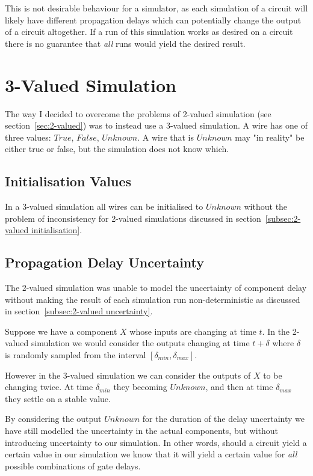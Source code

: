 This is not desirable behaviour for a simulator, as each simulation of a circuit will likely have different propagation delays which can potentially change the output of a circuit altogether. If a run of this simulation works as desired on a circuit there is no guarantee that \textit{all} runs would yield the desired result.

\section{3-Valued Simulation}
\label{sec:3-valued}
The way I decided to overcome the problems of 2-valued simulation (see section~\ref{sec:2-valued}) was to instead use a 3-valued simulation. A wire has one of three values: $True$, $False$, $Unknown$. A wire that is $Unknown$ may "in reality" be either true or false, but the simulation does not know which.

\subsection{Initialisation Values}
In a 3-valued simulation all wires can be initialised to $Unknown$ without the problem of inconsistency for 2-valued simulations discussed in section~\ref{subsec:2-valued initialisation}.

\subsection{Propagation Delay Uncertainty}
\label{subsec:3-valued uncertainty}
The 2-valued simulation was unable to model the uncertainty of component delay without making the result of each simulation run non-deterministic as discussed in section~\ref{subsec:2-valued uncertainty}.

Suppose we have a component $X$ whose inputs are changing at time $t$. In the 2-valued simulation we would consider the outputs changing at time $t + \delta$ where $\delta$ is randomly sampled from the interval $[\delta_{min}, \delta_{max}]$. 

However in the 3-valued simulation we can consider the outputs of $X$ to be changing twice. At time $\delta_{min}$ they becoming $Unknown$, and then at time $\delta_{max}$ they settle on a stable value. 

By considering the output $Unknown$ for the duration of the delay uncertainty we have still modelled the uncertainty in the actual components, but without introducing uncertainty to our simulation. In other words, should a circuit yield a certain value in our simulation we know that it will yield a certain value for \textit{all} possible combinations of gate delays.

